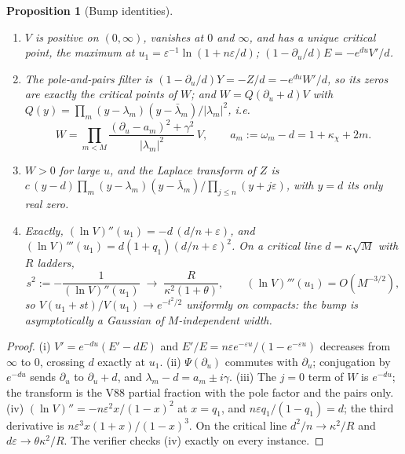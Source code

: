 \documentclass[11pt]{article}
\newtheorem{proposition}[theorem]{Proposition}
\theoremstyle{definition}
\theoremstyle{remark}
\begin{document}
\begin{proposition}[Bump identities]
\label{prop:f2v73-bump}
\begin{enumerate}[label=\textup{(\roman*)}]
\item \(V\) is positive on \((0,\infty)\), vanishes at \(0\) and \(\infty\),
and has a unique critical point, the maximum at
\(u_1=\varepsilon^{-1}\ln(1+n\varepsilon/d)\); \((1-\partial_u/d)E=-e^{du}V'/d\).
\item The pole-and-pairs filter is \((1-\partial_u/d)Y=-Z/d=-e^{du}W'/d\), so
its zeros are exactly the critical points of \(W\); and
\(W=Q(\partial_u+d)V\) with \(Q(y)=\prod_m(y-\lambda_m)(y-\bar\lambda_m)/|\lambda_m|^2\),
i.e.
\begin{equation}
 W=\prod_{m<M}\frac{(\partial_u-a_m)^2+\gamma^2}{|\lambda_m|^2}\,V,\qquad
 a_m:=\omega_m-d=1+\kappa_\chi+2m .
 \label{eq:f2v73-W}
\end{equation}
\item \(W>0\) for large \(u\), and the Laplace transform of \(Z\) is
\(c\,(y-d)\prod_m(y-\lambda_m)(y-\bar\lambda_m)/\prod_{j\le n}(y+j\varepsilon)\),
with \(y=d\) its only real zero.
\item Exactly, \((\ln V)''(u_1)=-d\,(d/n+\varepsilon)\), and
\((\ln V)'''(u_1)=d(1+q_1)(d/n+\varepsilon)^2\).  On a critical line
\(d=\kappa\sqrt M\) with \(R\) ladders,
\begin{equation}
 s^2:=-\frac1{(\ln V)''(u_1)}\;\longrightarrow\;\frac{R}{\kappa^2(1+\theta)},
 \qquad (\ln V)'''(u_1)=O(M^{-3/2}),
 \label{eq:f2v73-width}
\end{equation}
so \(V(u_1+st)/V(u_1)\to e^{-t^2/2}\) uniformly on compacts: the bump is
asymptotically a Gaussian of \(M\)-independent width.
\end{enumerate}
\end{proposition}

\begin{proof}
(i) \(V'=e^{-du}(E'-dE)\) and \(E'/E=n\varepsilon e^{-\varepsilon u}/(1-e^{-\varepsilon u})\)
decreases from \(\infty\) to \(0\), crossing \(d\) exactly at \(u_1\).
(ii) \(\Psi(\partial_u)\) commutes with \(\partial_u\); conjugation by
\(e^{-du}\) sends \(\partial_u\) to \(\partial_u+d\), and
\(\lambda_m-d=a_m\pm i\gamma\).  (iii) The \(j=0\) term of \(W\) is
\(e^{-du}\); the transform is the V88 partial fraction with the pole
factor and the pairs only.  (iv) \((\ln V)''=-n\varepsilon^2x/(1-x)^2\)
at \(x=q_1\), and \(n\varepsilon q_1/(1-q_1)=d\); the third derivative
is \(n\varepsilon^3x(1+x)/(1-x)^3\).  On the critical line \(d^2/n\to\kappa^2/R\)
and \(d\varepsilon\to\theta\kappa^2/R\).  The verifier checks (iv) exactly
on every instance.
\end{proof}
\end{document}
